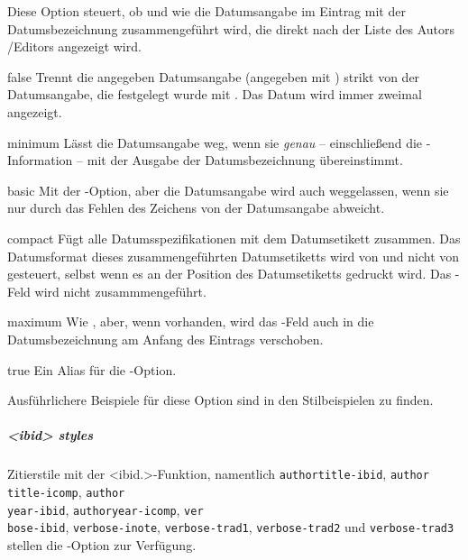 \documentclass{ltxdockit}[2011/03/25]
\begin{document}
\begin{optionlist}


Diese Option steuert, ob und wie die Datumsangabe im Eintrag mit der Datumsbezeichnung zusammengeführt wird, die direkt nach der Liste des Autors
\slash Editors angezeigt wird.

\begin{valuelist}
\item[false] Trennt die angegeben Datumsangabe (angegeben mit ) strikt von der Datumsangabe, die festgelegt wurde mit . Das Datum wird immer zweimal angezeigt.
\item[minimum] Lässt die Datumsangabe weg, wenn sie \emph{genau} -- einschließend  die -Information -- mit der Ausgabe der Datumsbezeichnung übereinstimmt. 
\item[basic] Mit der  -Option, aber die Datumsangabe wird 
auch weggelassen, wenn sie nur durch das Fehlen des Zeichens 
 von der Datumsangabe abweicht.
\item[compact] Fügt alle Datumsspezifikationen mit dem Datumsetikett zusammen.
Das Datumsformat dieses zusammengeführten Datumsetiketts wird von 
und nicht von  gesteuert, selbst wenn es an der Position des Datumsetiketts gedruckt wird. Das -Feld wird nicht zusammmengeführt. \item[maximum] Wie , aber, wenn vorhanden, wird das
-Feld auch in die Datumsbezeichnung am Anfang des Eintrags verschoben. 
\item[true] Ein Alias für die  -Option.
\end{valuelist}

Ausführlichere Beispiele für diese Option sind in den Stilbeispielen zu finden.\end{optionlist}

\subparagraph{<ibid> styles} Zitierstile mit der <ibid.>-Funktion, namentlich \texttt{authortitle-ibid}, \texttt{author\\ title-icomp}, \texttt{author\\ year-ibid}, \texttt{authoryear-icomp}, \texttt{ver\\ bose-ibid}, \texttt{verbose-inote}, \texttt{verbose-trad1}, \texttt{verbose-trad2} und \texttt{verbose-trad3} stellen die -Option zur Verfügung.
\end{document}
